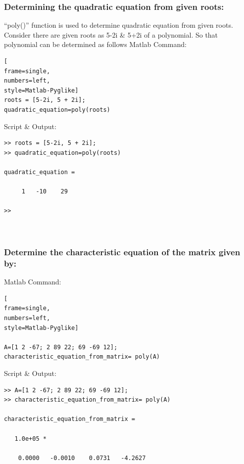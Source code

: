 \documentclass[conference]{IEEEtran}
\begin{document}
\subsubsection{Determining the quadratic equation from given roots:}
“poly()” function is used to determine 
quadratic equation from given roots.
Consider there are given roots as 5-2i \& 5+2i of 
a polynomial. So that polynomial can be 
determined as follows
Matlab Command:
\begin{lstlisting}[
frame=single,
numbers=left,
style=Matlab-Pyglike]
roots = [5-2i, 5 + 2i];
quadratic_equation=poly(roots)
\end{lstlisting}
Script \& Output:
\begin{verbatim}
>> roots = [5-2i, 5 + 2i];
>> quadratic_equation=poly(roots)

quadratic_equation =

     1   -10    29

>> 

    
\end{verbatim}

\subsubsection{Determine the characteristic 
equation of the matrix given by:}

Matlab Command:
\begin{lstlisting}[
frame=single,
numbers=left,
style=Matlab-Pyglike]

A=[1 2 -67; 2 89 22; 69 -69 12];
characteristic_equation_from_matrix= poly(A)

\end{lstlisting}
Script \& Output:
\begin{verbatim}
>> A=[1 2 -67; 2 89 22; 69 -69 12];
>> characteristic_equation_from_matrix= poly(A)

characteristic_equation_from_matrix =

   1.0e+05 *

    0.0000   -0.0010    0.0731   -4.2627


    
\end{verbatim}
\end{document}
